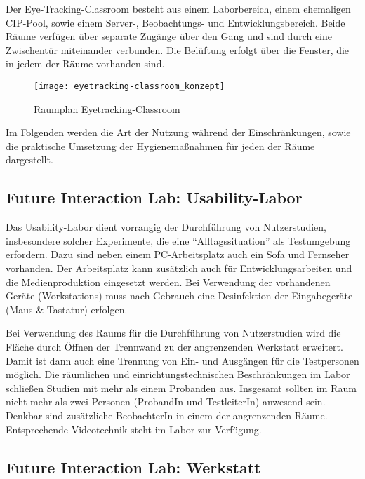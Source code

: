 \medskip
\noindent
Der Eye-Tracking-Classroom besteht aus einem Laborbereich, einem ehemaligen CIP-Pool, sowie einem Server-, Beobachtungs- und Entwicklungsbereich. Beide Räume verfügen über separate Zugänge über den Gang und sind durch eine Zwischentür miteinander verbunden.
Die Belüftung erfolgt über die Fenster, die in jedem der Räume vorhanden sind.

\medskip
\begin{figure}[h]
    \label{fig:raumplan_eyetracking}
    \centering
    \texttt{[image: eyetracking-classroom\_konzept]}
    \caption{Raumplan Eyetracking-Classroom}
\end{figure}

\medskip
\noindent
Im Folgenden werden die Art der Nutzung während der Einschränkungen, sowie die praktische Umsetzung der Hygienemaßnahmen für jeden der Räume dargestellt.

\subsection{Future Interaction Lab: Usability-Labor}\label{subsec:labore_fil_labor}


\noindent
Das Usability-Labor dient vorrangig der Durchführung von Nutzerstudien, insbesondere solcher Experimente, die eine ``Alltagssituation'' als Testumgebung erfordern. Dazu sind neben einem PC-Arbeitsplatz auch ein Sofa und Fernseher vorhanden.
Der Arbeitsplatz kann zusätzlich auch für Entwicklungsarbeiten und die Medienproduktion eingesetzt werden.
Bei Verwendung der vorhandenen Geräte (Workstations) muss nach Gebrauch eine Desinfektion der Eingabegeräte (Maus \& Tastatur) erfolgen.

\medskip
\noindent
Bei Verwendung des Raums für die Durchführung von Nutzerstudien wird die Fläche  durch Öffnen der Trennwand zu der angrenzenden Werkstatt erweitert. Damit ist dann auch eine Trennung von Ein- und Ausgängen für die Testpersonen möglich.
Die räumlichen und einrichtungstechnischen  Beschränkungen im Labor schließen Studien mit mehr als einem Probanden aus.
Insgesamt sollten im Raum nicht mehr als zwei Personen (ProbandIn und TestleiterIn) anwesend sein. Denkbar sind zusätzliche BeobachterIn in einem der angrenzenden Räume. Entsprechende Videotechnik steht im Labor zur Verfügung.

\subsection{Future Interaction Lab: Werkstatt}\label{subsec:labore_fil_werkstatt}

